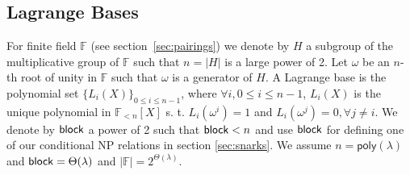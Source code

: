 \subsection{Lagrange Bases}
\label{sec:lagrange}
For finite field $\mathbb{F}$ (see section~\ref{sec:pairings}) we denote by $H$ a subgroup of the multiplicative group of $\mathbb{F}$ such that $n = |H|$ is a large power of 2. 
Let $\omega$ be an $n$-th root of unity in $\mathbb{F}$ such that $\omega$ is a generator of $H$. A Lagrange base is the polynomial set $\{L_i(X)\} _{0 \leq i\leq n-1}$, 
where $\forall i, 0 \leq i \leq n-1$, $L_i(X)$ is the unique polynomial in $\mathbb{F}_{<n}[X]$ s. t. $L_i(\omega^i) =1$ and $L_i(\omega^j) = 0, \forall j \neq i$. 
We denote by $\mathsf{block}$ a power of 2 such that $\mathsf{block} < n$ and use $\mathsf{block}$ for defining one of our conditional NP relations in section \ref{sec:snarks}. 
We assume $n = \mathsf{poly} (\lambda)$ and $\mathsf{block} = \Theta(\lambda)$ and $|\mathbb{F}|= 2^{\Theta(\lambda)}$.
 

